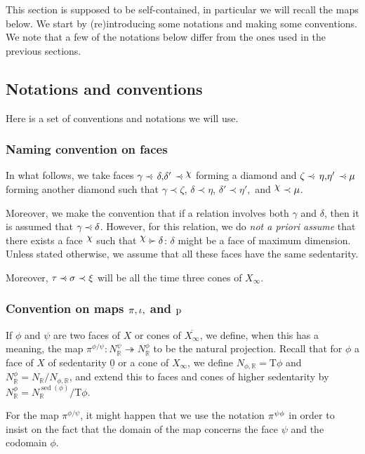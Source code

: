 \documentclass[11pt]{amsart}
\theoremstyle{definition}
\numberwithin{equation}{section}
\renewcommand{\~}{\widetilde}
\newcommand{\R}{\mathbb{R}}
\newcommand{\rquot}[2]{#1\big/#2}
\let\oldchi\chi
\newcommand{\raisechi}[2]{\raisebox{.4ex}{$#1#2$}}
\renewcommand{\chi}{{\mathpalette\raisechi\oldchi}}
\DeclareMathOperator{\sed}{sed} %
\newcommand{\TT}{\mathrm{T}} %
\let\i\relax
\newcommand{\i}{{\mathop{}\mathrm{i}}} %
\newcommand{\p}{{\rm p}} %
\newcommand{\comp}[1]{\overline{#1}} %
\newcommand{\conezero}{{\underline0}} %
\newcommand{\subface}{\prec}
\newcommand{\ssubface}{\mathbin{\mathchoice
  {\subface\!\!\!\cdot}%
  {\subface\!\!\!\cdot}%
  {\subface\!\cdot}%
  {\subface\!\cdot}%
}} %
\newcommand{\supface}{\succ}
\newcommand{\ssupface}{\mathbin{\mathchoice
  {\cdot\!\!\!\supface}%
  {\cdot\!\!\!\supface}%
  {\cdot\!\supface}%
  {\cdot\!\supface}%
}}
\begin{document}
{This section is supposed to be self-contained, in particular we will recall the maps below. We start by (re)introducing some notations and making some conventions. We note that a few of the notations below differ from the ones used in the previous sections.



\subsection{Notations and conventions}
Here is a set of conventions and notations we will use.


\subsubsection*{Naming convention on faces}
In what follows, we take faces $\gamma\ssubface\,\delta,\!\delta'\,\ssubface\chi$ forming a diamond and $\zeta\ssubface\,\eta,\!\eta'\,\ssubface\mu$ forming another diamond such that $\gamma \subface \zeta$, $\delta \subface \eta$, $\delta' \subface \eta',$ and $\chi \subface \mu$.

Moreover, we make the convention that if a relation involves both $\gamma$ and $\delta$, then it is assumed that $\gamma\ssubface\delta$. However, for this relation, we do \emph{not a priori assume} that there exists a face $\chi$ such that $\chi \ssupface\delta$: $\delta$ might be a face of maximum dimension. Unless stated otherwise, we assume that all these faces have the same sedentarity.

Moreover, $\tau\ssubface\sigma\subface\xi$ will be all the time three cones of $X_\infty$.

\medskip


\subsubsection*{Convention on maps $\pi, \iota, \i$ and $\p$}
If $\phi$ and $\psi$ are two faces of $X$ or cones of $\comp{X_\infty}$, we define, when this has a meaning, the map
$\pi^{\phi/\psi}\colon N^\psi_\R \twoheadrightarrow N^\phi_\R$ to be the natural projection. Recall that for $\phi$ a face of $X$ of sedentarity $\conezero$ or a cone of $X_\infty$, we define $N_{\phi,\R}=\TT\phi$ and $N^\phi_\R = \rquot{N_\R}{N_{\phi,\R}}$, and extend this to faces and cones of higher sedentarity by $N^\phi_\R = \rquot{N^{\sed(\phi)}_{\R}}{\TT\phi}$.

\medskip

For the map $\pi^{\phi/\psi}$, it might happen that we use the notation $\pi^{\psi\/\phi}$ in order to insist on the fact that the domain of the map concerns the face $\psi$ and the codomain $\phi$.

}
\end{document}
